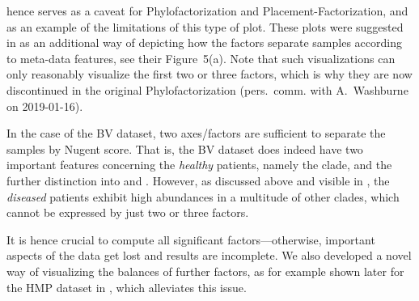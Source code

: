  hence serves as a caveat for Phylofactorization and Placement-Factori\-zation,
and as an example of the limitations of this type of plot.
These plots were suggested in  as an additional way of depicting
how the factors separate samples according to meta-data features, see their Figure~5(a).
Note that such visualizations can only reasonably visualize the first two or three factors,
which is why they are now discontinued in the original Phylofactorization
(pers.~comm. with A.~Washburne on 2019-01-16).

In the case of the \ac{BV} dataset, %
two axes/factors are sufficient to separate the samples by Nugent score.
That is, the \ac{BV} dataset does indeed have two important features concerning the \emph{healthy} patients,
namely the  clade, and the further distinction
into  and .
However, as discussed above and visible in ,
the \emph{diseased} patients exhibit high abundances in a multitude of other clades,
which cannot be expressed by just two or three factors.

It is hence crucial to compute all significant factors---otherwise,
important aspects of the data get lost and results are incomplete.
We also developed a novel way of visualizing the balances of further factors,
as for example shown later for the \ac{HMP} dataset in ,
which alleviates this issue.



